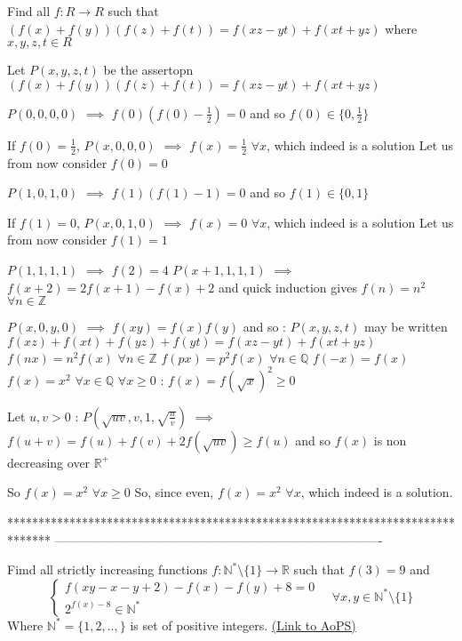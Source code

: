\begin{solution}
	\begin{tcolorbox}Find all $f:R\rightarrow R$ such that $(f(x)+f(y))(f(z)+f(t))=f(xz-yt)+f(xt+yz)$ where $x,y,z,t \in R$\end{tcolorbox}
Let $P(x,y,z,t)$ be the assertopn $(f(x)+f(y))(f(z)+f(t))=f(xz-yt)+f(xt+yz)$

$P(0,0,0,0)$ $\implies$ $f(0)(f(0)-\frac 12)=0$ and so $f(0)\in\{0,\frac 12\}$

If $f(0)=\frac 12$, $P(x,0,0,0)$ $\implies$ $\boxed{f(x)=\frac 12}$ $\forall x$, which indeed is a solution
Let us from now consider $f(0)=0$

$P(1,0,1,0)$ $\implies$ $f(1)(f(1)-1)=0$ and so $f(1)\in\{0,1\}$

If $f(1)=0$, $P(x,0,1,0)$ $\implies$ $\boxed{f(x)=0}$ $\forall x$, which indeed is a solution
Let us from now consider $f(1)=1$

$P(1,1,1,1)$ $\implies$ $f(2)=4$
$P(x+1,1,1,1)$ $\implies$ $f(x+2)=2f(x+1)-f(x)+2$ and quick induction gives $f(n)=n^2$ $\forall n\in\mathbb Z$

$P(x,0,y,0)$ $\implies$ $f(xy)=f(x)f(y)$ and so :
$P(x,y,z,t)$ may be written $f(xz)+f(xt)+f(yz)+f(yt)=f(xz-yt)+f(xt+yz)$
$f(nx)=n^2f(x)$ $\forall n\in\mathbb Z$
$f(px)=p^2f(x)$ $\forall n\in\mathbb Q$
$f(-x)=f(x)$
$f(x)=x^2$ $\forall x\in\mathbb Q$
$\forall x\ge 0$ : $f(x)=f(\sqrt x)^2\ge 0$

Let $u,v>0$ :
$P(\sqrt{uv},v,1,\sqrt{\frac uv})$ $\implies$ $f(u+v)=f(u)+f(v)+2f(\sqrt{uv})\ge f(u)$ and so $f(x)$ is non decreasing over $\mathbb R^+$

So $f(x)=x^2$ $\forall x\ge 0$
So, since even,  $\boxed{f(x)=x^2}$ $\forall x$, which indeed is a solution.
\end{solution}
*******************************************************************************
-------------------------------------------------------------------------------

\begin{problem}
	Fimd all strictly increasing  functions $f: \mathbb{N^*} \setminus \{1 \} \to \mathbb{R}$ such that $f(3)=9$ and 
\[\left\{\begin{matrix}f(xy-x-y+2)-f(x)-f(y)+8=0 \\ 2^{f(x)-8} \in \mathbb{N^*} \end{matrix}\right.\quad \forall x,y \in \mathbb{N^*} \setminus \{1 \}\]
Where $ \mathbb{N^*} =\{1,2,..,\}$ is set of positive integers.
	\flushright \href{https://artofproblemsolving.com/community/c6h568772}{(Link to AoPS)}
\end{problem}



